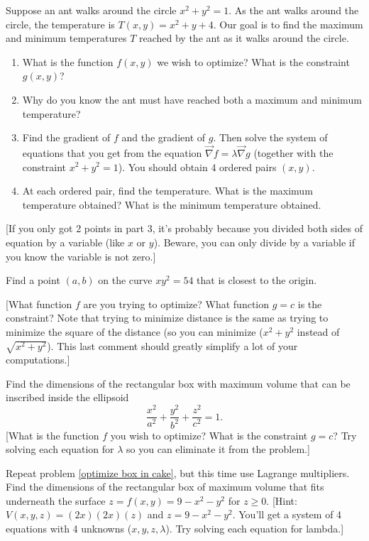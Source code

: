 \begin{problem}
 Suppose an ant walks around the circle $x^2+y^2=1$.  As the ant walks around the circle, the temperature is $T(x,y) = x^2+y+4$.  Our goal is to find the maximum and minimum temperatures $T$ reached by the ant as it walks around the circle. 
 \begin{enumerate}
  \item What is the function $f(x,y)$ we wish to optimize? What is the constraint $g(x,y)$?
  \item Why do you know the ant must have reached both a maximum and minimum temperature?
  \item Find the gradient of $f$ and the gradient of $g$.  Then solve the system of equations that you get from the equation $\vec \nabla f = \lambda \vec \nabla g$ (together with the constraint $x^2+y^2=1$). You should obtain 4 ordered pairs $(x,y)$.
  \item At each ordered pair, find the temperature.  What is the maximum temperature obtained? What is the minimum temperature obtained.
 \end{enumerate}
[If you only got 2 points in part 3, it's probably because you divided both sides of equation by a variable (like $x$ or $y$).  Beware, you can only divide by a variable if you know the variable is not zero.]
\end{problem}

\begin{problem}
 Find a point $(a,b)$ on the curve $xy^2=54$ that is closest to the origin.  

[What function $f$ are you trying to optimize? What function $g=c$ is the constraint? Note that trying to minimize distance is the same as trying to minimize the square of the distance (so you can minimize ($x^2+y^2$ instead of $\sqrt{x^2+y^2}$). This last comment should greatly simplify a lot of your computations.]
\end{problem}

\begin{problem}
 Find the dimensions of the rectangular box with maximum volume that can be inscribed inside the ellipsoid $$\frac{x^2}{a^2}+\frac{y^2}{b^2}+\frac{z^2}{c^2}=1.$$
[What is the function $f$ you wish to optimize? What is the constraint $g=c$? Try solving each equation for $\lambda$ so you can eliminate it from the problem.]
\end{problem}

\begin{problem}
Repeat problem \ref{optimize box in cake}, but this time use Lagrange multipliers.
Find the dimensions of the rectangular box of maximum volume that fits underneath the surface $z=f(x,y)=9-x^2-y^2$ for $z\geq 0$. [Hint: $V(x,y,z) = (2x)(2x)(z)$ and $z=9-x^2-y^2$. You'll get a system of 4 equations with 4 unknowns ($x,y,z,\lambda$).  Try solving each equation for lambda.]
\end{problem}

